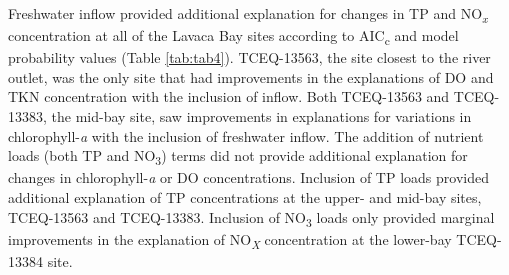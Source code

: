 \documentclass[water,article,submit,oneauthor]{Definitions/mdpi}
\begin{document}
Freshwater inflow provided additional explanation for changes in TP and
NO\textsubscript{\emph{x}} concentration at all of the Lavaca Bay sites
according to AIC\textsubscript{c} and model probability values (Table
\ref{tab:tab4}). TCEQ-13563, the site closest to the river outlet, was
the only site that had improvements in the explanations of DO and TKN
concentration with the inclusion of inflow. Both TCEQ-13563 and
TCEQ-13383, the mid-bay site, saw improvements in explanations for
variations in chlorophyll-\emph{a} with the inclusion of freshwater
inflow. The addition of nutrient loads (both TP and NO\textsubscript{3})
terms did not provide additional explanation for changes in
chlorophyll-\emph{a} or DO concentrations. Inclusion of TP loads
provided additional explanation of TP concentrations at the upper- and
mid-bay sites, TCEQ-13563 and TCEQ-13383. Inclusion of
NO\textsubscript{3} loads only provided marginal improvements in the
explanation of NO\textsubscript{\emph{X}} concentration at the lower-bay
TCEQ-13384 site.
\end{document}
